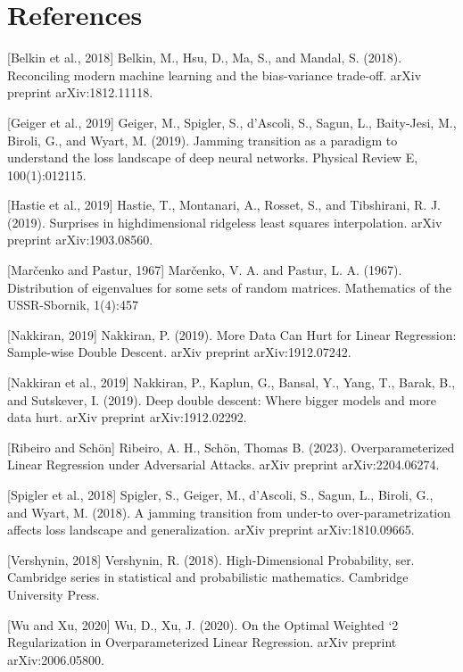 \documentclass{article}
\begin{document}
\section*{References}

[Belkin et al., 2018] Belkin, M., Hsu, D., Ma, S., and Mandal, S. (2018). Reconciling modern machine
learning and the bias-variance trade-off. arXiv preprint arXiv:1812.11118.

[Geiger et al., 2019] Geiger, M., Spigler, S., d’Ascoli, S., Sagun, L., Baity-Jesi, M., Biroli, G., and Wyart,
M. (2019). Jamming transition as a paradigm to understand the loss landscape of deep neural networks.
Physical Review E, 100(1):012115.

[Hastie et al., 2019] Hastie, T., Montanari, A., Rosset, S., and Tibshirani, R. J. (2019). Surprises in highdimensional ridgeless least squares interpolation. arXiv preprint arXiv:1903.08560.

[Marčenko and Pastur, 1967] Marčenko, V. A. and Pastur, L. A. (1967). Distribution of eigenvalues for some
sets of random matrices. Mathematics of the USSR-Sbornik, 1(4):457

[Nakkiran, 2019] Nakkiran, P. (2019). More Data Can Hurt for Linear Regression: Sample-wise Double Descent. arXiv preprint arXiv:1912.07242.

[Nakkiran et al., 2019] Nakkiran, P., Kaplun, G., Bansal, Y., Yang, T., Barak, B., and Sutskever, I. (2019).
Deep double descent: Where bigger models and more data hurt. arXiv preprint arXiv:1912.02292.

[Ribeiro and Schön] Ribeiro, A. H., Schön, Thomas B. (2023). Overparameterized Linear Regression under Adversarial Attacks. arXiv preprint arXiv:2204.06274.

[Spigler et al., 2018] Spigler, S., Geiger, M., d’Ascoli, S., Sagun, L., Biroli, G., and Wyart, M. (2018). A
jamming transition from under-to over-parametrization affects loss landscape and generalization. arXiv
preprint arXiv:1810.09665.

[Vershynin, 2018] Vershynin, R. (2018). High-Dimensional Probability, ser. Cambridge series in statistical and probabilistic mathematics. Cambridge University Press.

[Wu and Xu, 2020] Wu, D., Xu, J. (2020). On the Optimal Weighted `2 Regularization in Overparameterized Linear Regression. arXiv preprint arXiv:2006.05800.
\end{document}
